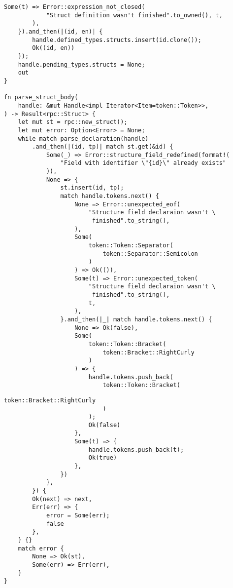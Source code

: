 \begin{lstlisting}[caption={Разбор структуры (часть 2)}, label={lst:rust_parser_struct2}]
        Some(t) => Error::expression_not_closed(
            "Struct definition wasn't finished".to_owned(), t,
        ),
    }).and_then(|(id, en)| {
        handle.defined_types.structs.insert(id.clone());
        Ok((id, en))
    });
    handle.pending_types.structs = None;
    out
}

fn parse_struct_body(
    handle: &mut Handle<impl Iterator<Item=token::Token>>,
) -> Result<rpc::Struct> {
    let mut st = rpc::new_struct();
    let mut error: Option<Error> = None;
    while match parse_declaration(handle)
        .and_then(|(id, tp)| match st.get(&id) {
            Some(_) => Error::structure_field_redefined(format!(
                "Field with identifier \"{id}\" already exists"
            )),
            None => {
                st.insert(id, tp);
                match handle.tokens.next() {
                    None => Error::unexpected_eof(
                        "Structure field declaraion wasn't \
                         finished".to_string(),
                    ),
                    Some(
                        token::Token::Separator(
                            token::Separator::Semicolon
                        )
                    ) => Ok(()),
                    Some(t) => Error::unexpected_token(
                        "Structure field declaraion wasn't \
                         finished".to_string(),
                        t,
                    ),
                }.and_then(|_| match handle.tokens.next() {
                    None => Ok(false),
                    Some(
                        token::Token::Bracket(
                            token::Bracket::RightCurly
                        )
                    ) => {
                        handle.tokens.push_back(
                            token::Token::Bracket(
\end{lstlisting}
\clearpage
\begin{lstlisting}[caption={Разбор структуры (часть 3)}, label={lst:rust_parser_struct3}]
                                token::Bracket::RightCurly
                            )
                        );
                        Ok(false)
                    },
                    Some(t) => {
                        handle.tokens.push_back(t);
                        Ok(true)
                    },
                })
            },
        }) {
        Ok(next) => next,
        Err(err) => {
            error = Some(err);
            false
        },
    } {}
    match error {
        None => Ok(st),
        Some(err) => Err(err),
    }
}
\end{lstlisting}

